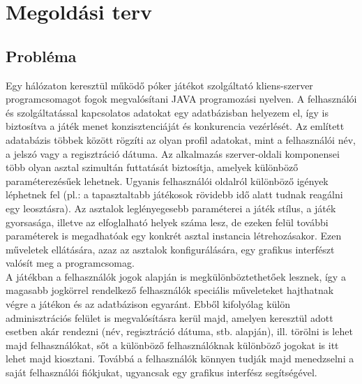 \section{Megoldási terv}
\subsection{Probléma}
Egy hálózaton keresztül működő póker játékot szolgáltató kliens-szerver programcsomagot fogok megvalósítani JAVA programozási nyelven. A felhasználói és szolgáltatással kapcsolatos adatokat egy adatbázisban helyezem el, így is biztosítva a játék menet konzisztenciáját és konkurencia vezérlését. Az említett adatabázis többek között rögzíti az olyan profil adatokat, mint a felhasználói név, a jelszó vagy a regisztráció dátuma.
Az alkalmazás szerver-oldali komponensei több olyan asztal szimultán futtatását biztosítja, amelyek különböző paraméterezésűek lehetnek. Ugyanis felhasználói oldalról különböző igények léphetnek fel (pl.: a tapasztaltabb játékosok rövidebb idő alatt tudnak reagálni egy leosztásra). Az asztalok leglényegesebb paraméterei a játék stílus, a játék gyorsasága, illetve az elfoglalható helyek száma lesz, de ezeken felül további paraméterek is megadhatóak egy konkrét asztal instancia létrehozásakor. Ezen műveletek ellátására, azaz az asztalok konfigurálására, egy grafikus interfészt valósít meg a programcsomag. \\
A játékban a felhasználók jogok alapján is megkülönböztethetőek lesznek, így a magasabb jogkörrel rendelkező felhasználók speciális műveleteket hajthatnak végre a játékon és az adatbázison egyaránt. Ebből kifolyólag külön adminisztrációs felület is megvalósításra kerül majd, amelyen keresztül adott esetben akár rendezni (név, regisztráció dátuma, stb. alapján), ill. törölni is lehet majd felhasználókat, sőt a különböző felhasználóknak különböző jogokat is itt lehet majd kiosztani. Továbbá a felhasználók könnyen tudják majd menedzselni a saját felhasználói fiókjukat, ugyancsak egy grafikus interfész segítségével.

